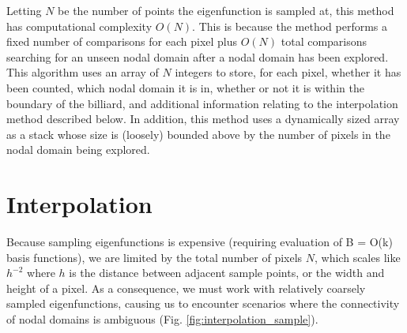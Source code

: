\documentclass{report}
\begin{document}
Letting $N$ be the number of points the eigenfunction is sampled at, this method has computational complexity $O(N)$. This is because the method performs a fixed number of comparisons for each pixel plus $O(N)$ total comparisons searching for an unseen nodal domain after a nodal domain has been explored. This algorithm uses an array of $N$ integers to store, for each pixel, whether it has been counted, which nodal domain it is in, whether or not it is within the boundary of the billiard, and additional information relating to the interpolation method described below. In addition, this method uses a dynamically sized array as a stack whose size is (loosely) bounded above by the number of pixels in the nodal domain being explored.

\section{Interpolation}
Because sampling eigenfunctions is expensive (requiring evaluation of B = O(k) basis functions), we are limited by the total number of pixels $N$, which scales like $h^{-2}$ where $h$ is the distance between adjacent sample points, or the width and height of a pixel. As a consequence, we must work with relatively coarsely sampled eigenfunctions, causing us to encounter scenarios where the connectivity of nodal domains is ambiguous (Fig. \ref{fig:interpolation_sample}).
\end{document}
